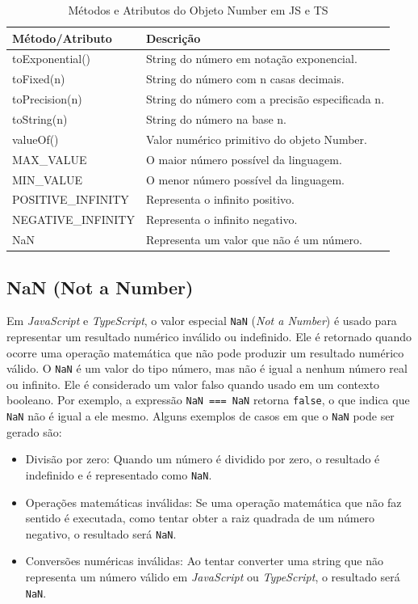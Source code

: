 \begin{table}
\centering
\caption{Métodos e Atributos do Objeto Number em JS e TS}
\label{tab:numberObject}
\begin{tabular}{|l|l|}
\hline
\textbf{Método/Atributo} & \textbf{Descrição} \\ \hline
toExponential() & String do número em notação exponencial. \\ \hline
toFixed(n) & String do número com n casas decimais. \\ \hline
toPrecision(n) & String do número com a precisão especificada n. \\ \hline
toString(n) & String do número na base n. \\ \hline
valueOf() & Valor numérico primitivo do objeto Number. \\ \hline
MAX\_VALUE & O maior número possível da linguagem. \\ \hline
MIN\_VALUE & O menor número possível da linguagem. \\ \hline
POSITIVE\_INFINITY & Representa o infinito positivo. \\ \hline
NEGATIVE\_INFINITY & Representa o infinito negativo. \\ \hline
NaN & Representa um valor que não é um número. \\ \hline
\end{tabular}
\end{table}



\subsection{NaN (Not a Number)}
Em \textit{JavaScript} e \textit{TypeScript}, o valor especial \texttt{NaN} (\textit{Not a Number}) é usado para representar um resultado numérico inválido ou indefinido. Ele é retornado quando ocorre uma operação matemática que não pode produzir um resultado numérico válido. O \texttt{NaN} é um valor do tipo número, mas não é igual a nenhum número real ou infinito. Ele é considerado um valor falso quando usado em um contexto booleano. Por exemplo, a expressão \texttt{NaN === NaN} retorna \texttt{false}, o que indica que \texttt{NaN} não é igual a ele mesmo. Alguns exemplos de casos em que o \texttt{NaN} pode ser gerado são:

\begin{itemize}
  \item Divisão por zero: Quando um número é dividido por zero, o resultado é indefinido e é representado como \texttt{NaN}.
  \item Operações matemáticas inválidas: Se uma operação matemática que não faz sentido é executada, como tentar obter a raiz quadrada de um número negativo, o resultado será \texttt{NaN}.
  \item Conversões numéricas inválidas: Ao tentar converter uma string que não representa um número válido em \textit{JavaScript} ou \textit{TypeScript}, o resultado será \texttt{NaN}.
\end{itemize}

